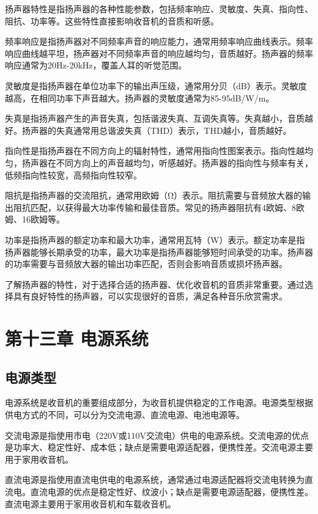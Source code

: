\documentclass[12pt,UTF8]{ctexbook}
\begin{document}
扬声器特性是指扬声器的各种性能参数，包括频率响应、灵敏度、失真、指向性、阻抗、功率等。这些特性直接影响收音机的音质和听感。

频率响应是指扬声器对不同频率声音的响应能力，通常用频率响应曲线表示。频率响应曲线越平坦，扬声器对不同频率声音的响应越均匀，音质越好。扬声器的频率响应通常为20Hz-20kHz，覆盖人耳的听觉范围。

灵敏度是指扬声器在单位功率下的输出声压级，通常用分贝（dB）表示。灵敏度越高，在相同功率下声音越大。扬声器的灵敏度通常为85-95dB/W/m。

失真是指扬声器产生的声音失真，包括谐波失真、互调失真等。失真越小，音质越好。扬声器的失真通常用总谐波失真（THD）表示，THD越小，音质越好。

指向性是指扬声器在不同方向上的辐射特性，通常用指向性图案表示。指向性越均匀，扬声器在不同方向上的声音越均匀，听感越好。扬声器的指向性与频率有关，低频指向性较宽，高频指向性较窄。

阻抗是指扬声器的交流阻抗，通常用欧姆（Ω）表示。阻抗需要与音频放大器的输出阻抗匹配，以获得最大功率传输和最佳音质。常见的扬声器阻抗有4欧姆、8欧姆、16欧姆等。

功率是指扬声器的额定功率和最大功率，通常用瓦特（W）表示。额定功率是指扬声器能够长期承受的功率，最大功率是指扬声器能够短时间承受的功率。扬声器的功率需要与音频放大器的输出功率匹配，否则会影响音质或损坏扬声器。

了解扬声器的特性，对于选择合适的扬声器、优化收音机的音质非常重要。通过选择具有良好特性的扬声器，可以实现很好的音质，满足各种音乐欣赏需求。

\chapter{第十三章 电源系统}

\section{电源类型}

电源系统是收音机的重要组成部分，为收音机提供稳定的工作电源。电源类型根据供电方式的不同，可以分为交流电源、直流电源、电池电源等。

交流电源是指使用市电（220V或110V交流电）供电的电源系统。交流电源的优点是功率大、稳定性好、成本低；缺点是需要电源适配器，便携性差。交流电源主要用于家用收音机。

直流电源是指使用直流电供电的电源系统，通常通过电源适配器将交流电转换为直流电。直流电源的优点是稳定性好、纹波小；缺点是需要电源适配器，便携性差。直流电源主要用于家用收音机和车载收音机。
\end{document}
